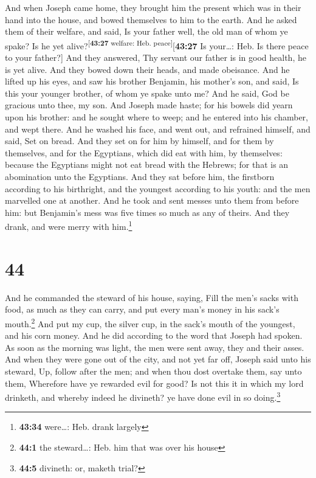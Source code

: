  And when Joseph came home, they brought him the present
which was in their hand into the house, and bowed themselves to him to
the earth.  And he asked them of their welfare, and said,
Is your father well, the old man of whom ye spake? Is he yet
alive?\textsuperscript{{[}\textbf{43:27} welfare: Heb.
peace{]}}{[}\textbf{43:27} Is your\ldots: Heb. Is there peace to your
father?{]}  And they answered, Thy servant our father is
in good health, he is yet alive. And they bowed down their heads, and
made obeisance.  And he lifted up his eyes, and saw his
brother Benjamin, his mother's son, and said, Is this your younger
brother, of whom ye spake unto me? And he said, God be gracious unto
thee, my son.  And Joseph made haste; for his bowels did
yearn upon his brother: and he sought where to weep; and he entered into
his chamber, and wept there.  And he washed his face, and
went out, and refrained himself, and said, Set on bread. 
And they set on for him by himself, and for them by themselves, and for
the Egyptians, which did eat with him, by themselves: because the
Egyptians might not eat bread with the Hebrews; for that is an
abomination unto the Egyptians.  And they sat before him,
the firstborn according to his birthright, and the youngest according to
his youth: and the men marvelled one at another.  And he
took and sent messes unto them from before him: but Benjamin's mess was
five times so much as any of theirs. And they drank, and were merry with
him.\footnote{\textbf{43:34} were\ldots: Heb. drank largely}

\hypertarget{section-43}{%
\section{44}\label{section-43}}

 And he commanded the steward of his house, saying, Fill
the men's sacks with food, as much as they can carry, and put every
man's money in his sack's mouth.\footnote{\textbf{44:1} the
  steward\ldots: Heb. him that was over his house}  And
put my cup, the silver cup, in the sack's mouth of the youngest, and his
corn money. And he did according to the word that Joseph had spoken.
 As soon as the morning was light, the men were sent away,
they and their asses.  And when they were gone out of the
city, and not yet far off, Joseph said unto his steward, Up, follow
after the men; and when thou dost overtake them, say unto them,
Wherefore have ye rewarded evil for good?  Is not this it
in which my lord drinketh, and whereby indeed he divineth? ye have done
evil in so doing.\footnote{\textbf{44:5} divineth: or, maketh trial?}


